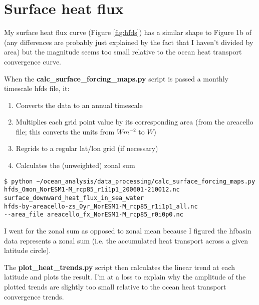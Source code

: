 \section{Surface heat flux}

My surface heat flux curve (Figure \ref{fig:hfds}) has a similar shape to Figure 1b of \citet{Nummelin_2017} (any differences are probably just explained by the fact that I haven't divided by area) but the magnitude seems too small relative to the ocean heat transport convergence curve.

When the \textbf{calc_surface_forcing_maps.py} script is passed a monthly timescale hfds file, it:
\begin{enumerate}
\item Converts the data to an annual timescale
\item Multiplies each grid point value by its corresponding area (from the areacello file; this converts the units from $Wm^{-2}$ to $W$)
\item Regrids to a regular lat/lon grid (if necessary)
\item Calculates the (unweighted) zonal sum
\end{enumerate}

\begin{verbatim}
$ python ~/ocean_analysis/data_processing/calc_surface_forcing_maps.py
hfds_Omon_NorESM1-M_rcp85_r1i1p1_200601-210012.nc 
surface_downward_heat_flux_in_sea_water 
hfds-by-areacello-zs_Oyr_NorESM1-M_rcp85_r1i1p1_all.nc 
--area_file areacello_fx_NorESM1-M_rcp85_r0i0p0.nc
\end{verbatim}

I went for the zonal sum as opposed to zonal mean because I figured the hfbasin data represents a zonal sum (i.e. the accumulated heat transport across a given latitude circle).

The \textbf{plot_heat_trends.py} script then calculates the linear trend at each latitude and plots the result. I'm at a loss to explain why the amplitude of the plotted trends are slightly too small relative to the ocean heat transport convergence trends.



